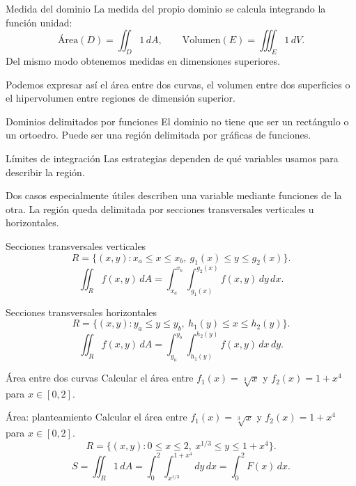 \documentclass[original_version/main.tex]{subfiles}
\begin{document}
\begin{frame}{Medida del dominio}
La medida del propio dominio se calcula integrando la función unidad:\[\text{Área}(D)=\iint_D1\,dA,\qquad\text{Volumen}(E)=\iiint_E1\,dV.\]Del mismo modo obtenemos medidas en dimensiones superiores.\par\medskip Podemos expresar así el área entre dos curvas, el volumen entre dos superficies o el hipervolumen entre regiones de dimensión superior.
\end{frame}

\begin{frame}{Dominios delimitados por funciones}
El dominio no tiene que ser un rectángulo o un ortoedro. Puede ser una región delimitada por gráficas de funciones.
\end{frame}

\begin{frame}{Límites de integración}
Las estrategias dependen de qué variables usamos para describir la región.\par\medskip Dos casos especialmente útiles describen una variable mediante funciones de la otra. La región queda delimitada por \alert{secciones transversales verticales u horizontales}.
\end{frame}

\begin{frame}{Secciones transversales verticales}
\small\[R=\{(x,y):x_a\le x\le x_b,\ g_1(x)\le y\le g_2(x)\}.\]\[\iint_R f(x,y)\,dA=\int_{x_a}^{x_b}\int_{g_1(x)}^{g_2(x)}f(x,y)\,dy\,dx.\]
\end{frame}

\begin{frame}{Secciones transversales horizontales}
\small\[R=\{(x,y):y_a\le y\le y_b,\ h_1(y)\le x\le h_2(y)\}.\]\[\iint_R f(x,y)\,dA=\int_{y_a}^{y_b}\int_{h_1(y)}^{h_2(y)}f(x,y)\,dx\,dy.\]
\end{frame}

\begin{frame}{Área entre dos curvas}
Calcular el área entre $f_1(x)=\sqrt[3]{x}$ y $f_2(x)=1+x^4$ para $x\in[0,2]$.
\end{frame}

\begin{frame}{Área: planteamiento}
\small Calcular el área entre $f_1(x)=\sqrt[3]{x}$ y $f_2(x)=1+x^4$ para $x\in[0,2]$.\[R=\{(x,y):0\le x\le2,\ x^{1/3}\le y\le1+x^4\}.\]\[S=\iint_R1\,dA=\int_0^2\int_{x^{1/3}}^{1+x^4}dy\,dx=\int_0^2 F(x)\,dx.\]
\end{frame}
\end{document}

